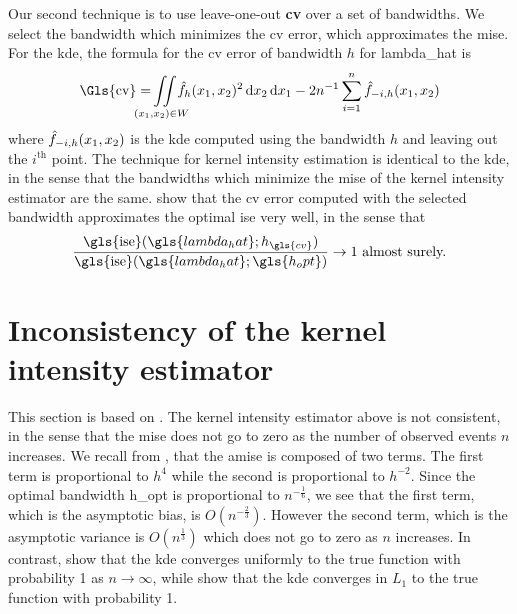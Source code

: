 Our second technique is to use leave-one-out \textbf{\gls{cv}} over a set of bandwidths.
We select the bandwidth which minimizes the \gls{cv} error,
which approximates the \gls{mise}.
For the \gls{kde}, the formula for the \gls{cv} error of bandwidth $h$ for \gls{lambda_hat} is
\begin{equation}
    \label{eq:cverror}
    \mbox{\Gls{cv}}%
        = \iintW{\hat{f}_h \xvec^2}
        - 2 n^{-1} \sum\limits_{i=1}^n \hat{f}_{-i,h}\xvec%
\end{equation}
where $\hat{f}_{-i,h}(x_1, x_2)$ is the \gls{kde} computed using the bandwidth $h$ and leaving out the $i^\text{th}$ point.
The technique for \gls{kernel intensity estimation} is identical to the \gls{kde},
in the sense that the bandwidths which minimize the \gls{mise} of the \gls{kernel intensity estimator} are the same. 
 show that the \gls{cv} error computed with the selected bandwidth approximates the optimal \gls{ise} very well,
in the sense that
\begin{equation*}
    \frac   {\mbox{\gls{ise}}(\gls{lambda_hat}; h_{\gls{cv}})}%
            {\mbox{\gls{ise}}(\gls{lambda_hat}; \gls{h_opt})}%
            \to 1 ~\text{almost surely.}%
\end{equation*}

\section{Inconsistency of the kernel intensity estimator}
\label{sec:theory:inconsistency}

This section is based on \citet{guan2008consistent}.
The \gls{kernel intensity estimator} above is not consistent,
in the sense that the \gls{mise} does not go to zero as the number of observed events $n$ increases.
We recall from ,
that the \gls{amise} is composed of two terms.
The first term is proportional to $h^4$ while the second is proportional to $h^{-2}$.
Since the optimal bandwidth \gls{h_opt} is proportional to $n^{-\frac{1}{6}}$,
we see that the first term,
which is the asymptotic bias,
is $O(n^{-\frac{2}{3}})$.
However the second term,
which is the asymptotic variance is $O(n^{\frac{1}{3}})$ which does not go to zero as $n$ increases.
In contrast,
\citet{bertrand1978convergence} show that the \gls{kde} converges uniformly to the true function with probability 1 as $n \to \infty$,
while \citet{devroye1985nonparametric} show that the \gls{kde} converges in $L_1$ to the true function with probability 1.

